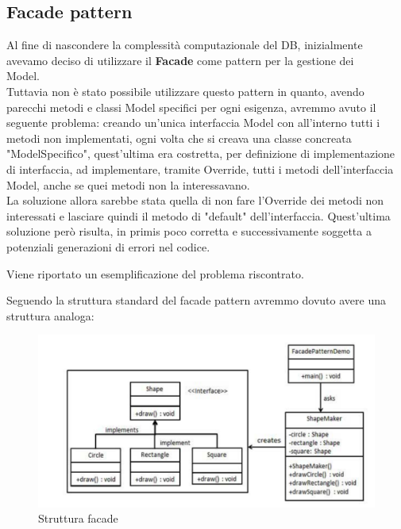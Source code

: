 \documentclass[a4paper,11pt]{report}
\begin{document}
\subsection{Facade pattern}
Al fine di nascondere la complessità computazionale del DB, inizialmente avevamo deciso di utilizzare il \textbf{Facade} come pattern per la gestione dei\\ Model.\\
Tuttavia non è stato possibile utilizzare questo pattern in quanto, avendo parecchi metodi e classi Model specifici per ogni esigenza, avremmo avuto il seguente problema: creando un'unica interfaccia Model con all'interno tutti i metodi non implementati, ogni volta che si creava una classe concreata "ModelSpecifico", quest'ultima era costretta, per definizione di implementazione di interfaccia, ad implementare, tramite Override, tutti i metodi dell'interfaccia Model, anche se quei metodi non la interessavano.\\
La soluzione allora sarebbe stata quella di non fare l'Override dei metodi non interessati e lasciare quindi il metodo di "default" dell'interfaccia. Quest'ultima soluzione però risulta, in primis poco corretta e successivamente soggetta a potenziali generazioni di errori nel codice.
\newline

Viene riportato un esemplificazione del problema riscontrato.

Seguendo la struttura standard del facade pattern avremmo dovuto avere una struttura analoga:\\
     \begin{figure}[h!]
    	\centering
    	\includegraphics[width=1\linewidth]{Other/schema facade.PNG}
    	\caption{Struttura facade}
    \end{figure}\\
\clearpage
\end{document}

